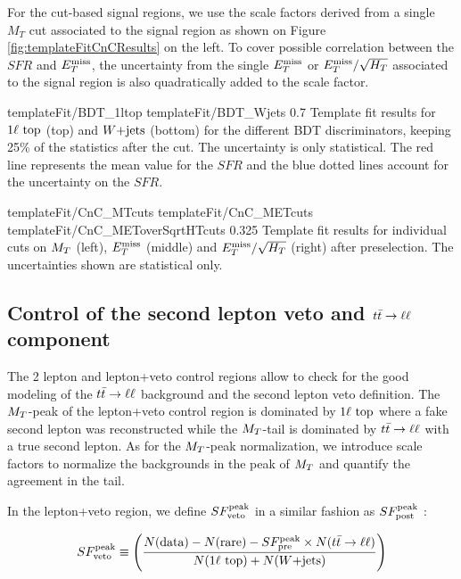         For the cut-based signal regions, we use the scale factors derived from a single $M_T$ cut associated to the signal region as shown on Figure \ref{fig:templateFitCnCResults} on the left. To cover possible correlation between the $SFR$ and $E_T^\text{miss}$, the uncertainty from the single $E_T^\text{miss}$ or $E_T^\text{miss}/\sqrt{H_T}$ associated to the signal region is also quadratically added to the scale factor.

                          {templateFit/BDT_1ltop}
                          {templateFit/BDT_Wjets}
                          {0.7}
                          {Template fit results for $1\ell~\text{top}$ (top) and $\text{$W$+jets}$ (bottom) for the different BDT discriminators, keeping 25\% of the statistics after the cut. The uncertainty is only statistical. The red line represents the mean value for the $SFR$ and the blue dotted lines account for the uncertainty on the $SFR$.}

                           {templateFit/CnC_MTcuts}
                           {templateFit/CnC_METcuts}
                           {templateFit/CnC_METoverSqrtHTcuts}
                           {0.325}
                           {Template fit results for individual cuts on $M_T$ (left), $E_T^\text{miss}$ (middle) and $E_T^\text{miss}/\sqrt{H_T}$ (right) after preselection. The uncertainties shown are statistical only.}
        
        \subsection{Control of the second lepton veto and $t\bar{t} \rightarrow \ell \ell$ component}

        The 2 lepton and lepton+veto control regions allow to check for the good modeling of the $t\bar{t} \rightarrow \ell \ell$ background and the second lepton veto definition. The $M_T$-peak of the lepton+veto control region is dominated by $1\ell~\text{top}$ where a fake second lepton was reconstructed while the $M_T$-tail is dominated by $t\bar{t} \rightarrow \ell \ell$ with a true second lepton. As for the $M_T$-peak normalization, we introduce scale factors to normalize the backgrounds in the peak of $M_T$ and quantify the agreement in the tail. 

        In the lepton+veto region, we define $SF_{\text{veto}}^{\text{peak}}$ in a similar fashion as $SF_{\text{post}}^{\text{peak}}$ :

        \begin{equation}
            SF_{\text{veto}}^{\text{peak}} \equiv \left( \frac{N(\text{data}) - N(\text{rare}) - SF_{\text{pre}}^{\text{peak}} \times N(t\bar{t} \rightarrow \ell \ell)}{N(1\ell~\text{top}) + N(\text{$W$+jets})} \right)
        \end{equation}

